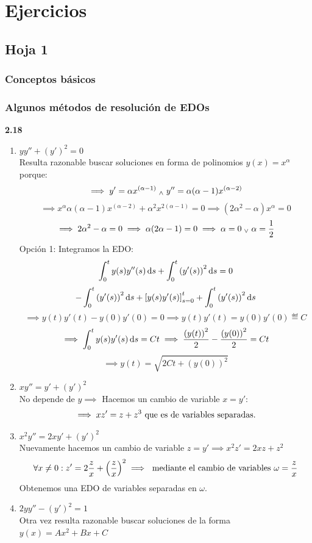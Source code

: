 \section{Ejercicios}


\subsection{Hoja 1}

\subsubsection{Conceptos básicos}

\subsubsection{Algunos métodos de resolución de EDOs}
\textbf{2.18} \begin{enumerate}
	\item $yy'' + {(y')}^2=0$ \\
	      Resulta razonable buscar soluciones en forma de polinomios $y(x)=x^\alpha$ porque:
	      \[\implies y'=\alpha x ^{(\alpha-1)} \; _{\wedge} \; y''=\alpha(\alpha-1)x^{(\alpha-2)}\]
	      \[\implies x^{\alpha}\alpha(\alpha-1)x^{(\alpha-2)} + \alpha^2 x ^{2(\alpha-1)} = 0\implies (2\alpha^2-\alpha)x^\alpha=0\]
	      \[\implies 2\alpha^2-\alpha=0 \implies \alpha(2\alpha-1)=0 \implies \alpha=0 \; _{\vee} \; \alpha=\frac{1}{2}\]
	      Opción 1: Integramos la EDO:%
	      \[\int_{0}^{t} y(s) y''(s)\odif{s} + \int_{0}^{t} {(y'(s))}^2 \odif{s} = 0\]
	      \[-\int_{0}^t {(y'(s))}^2 \odif{s} + {[y(s)y'(s)]}^t_{s=0} + \int_{0}^{t} {(y'(s))}^2 \odif{s}\]
	      \[\implies y(t)y'(t)-y(0)y'(0)=0 \implies y(t)y'(t)=y(0)y'(0)\eqdef C\]
	      \[\implies \int_{0}^{t} y(s)y'(s)\odif{s}=Ct \implies \frac{{(y(t))}^2}{2}  -\frac{{(y(0))}^2}{2}=Ct\]
	      \[\implies y(t)=\sqrt{2Ct+{(y(0))}^2}\]
	\item $xy''=y'+{(y')}^2$ \\
	      No depende de $y \implies$ Hacemos un cambio de variable $x=y'$:
	      \[\implies xz'=z+z^3 \text{ que es de variables separadas.}\]
	\item $x^2y''=2xy'+{(y')}^2$ \\
	      Nuevamente hacemos un cambio de variable $z=y' \implies x^2z'=2xz+z^2$
	      \[\forall x \ne 0 : z'=2\frac{z}{x} + {\left(\frac{z}{x}\right)}^2 \implies \text{ mediante el cambio de variables } \omega = \frac{z}{x}\]
	      Obtenemos una EDO de variables separadas en $\omega$.
	\item $2yy''-{(y')}^2=1$ \\
	      Otra vez resulta razonable buscar soluciones de la forma $y(x)=Ax^2 + Bx +C$
\end{enumerate}

